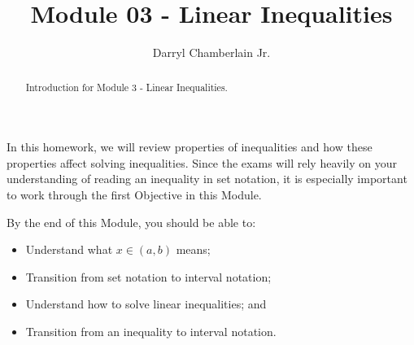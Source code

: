 \documentclass{ximera}
\author{Darryl Chamberlain Jr.}
\title{Module 03 - Linear Inequalities}
\begin{document}
\begin{abstract}
Introduction for Module 3 - Linear Inequalities.
\end{abstract}
\maketitle

In this homework, we will review properties of inequalities and how these properties affect solving inequalities. Since the exams will rely heavily on your understanding of reading an inequality in set notation, it is especially important to work through the first Objective in this Module. 

By the end of this Module, you should be able to:
\begin{itemize}
	\item Understand what $x \in (a, b)$ means;
	\item Transition from set notation to interval notation;
	\item Understand how to solve linear inequalities; and
	\item Transition from an inequality to interval notation.
\end{itemize}
\end{document}
